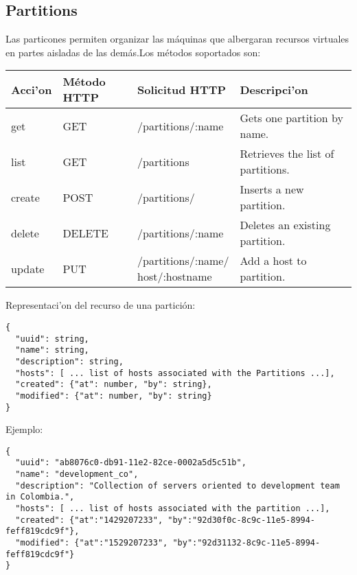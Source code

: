 \subsection{Partitions}
Las particones permiten organizar las máquinas que albergaran recursos virtuales en partes aisladas de las demás.Los métodos soportados son:

\begin{center}
 \begin{tabular}{| l | l | l | l |}
 \hline
  \rowcolor{blueapi}
  \textbf{Acci'on} & \textbf{Método HTTP} & \textbf{Solicitud HTTP} & \textbf{Descripci'on} \\ [0.5ex] 
  \hline\hline
  get & GET & /partitions/:name & Gets one partition by name. \\
  \hline
  list & GET & /partitions & Retrieves the list of partitions. \\
  \hline  
  create & POST & /partitions/ & Inserts a new partition. \\
  \hline
  delete & DELETE & /partitions/:name & Deletes an existing partition. \\
  \hline  
  update & PUT & \pbox{5cm}{/partitions/:name/ \\host/:hostname} & Add a host to partition. \\ [1ex] 
  \hline
\end{tabular}
\end{center}

Representaci'on del recurso de una partición:

\medskip
\begin{lstlisting}[style=json]
{
  "uuid": string,
  "name": string,
  "description": string, 
  "hosts": [ ... list of hosts associated with the Partitions ...],
  "created": {"at": number, "by": string},
  "modified": {"at": number, "by": string}
}
\end{lstlisting}

Ejemplo:

\medskip
\begin{lstlisting}[style=json]
{
  "uuid": "ab8076c0-db91-11e2-82ce-0002a5d5c51b",
  "name": "development_co",
  "description": "Collection of servers oriented to development team in Colombia.", 
  "hosts": [ ... list of hosts associated with the partition ...],
  "created": {"at":"1429207233", "by":"92d30f0c-8c9c-11e5-8994-feff819cdc9f"},
  "modified": {"at":"1529207233", "by":"92d31132-8c9c-11e5-8994-feff819cdc9f"}
}
\end{lstlisting}

